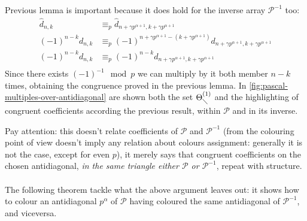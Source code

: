 Previous lemma is important because it does hold for the inverse array $\mathcal{P}^{-1}$ too:
\begin{displaymath}
    \begin{split}
        \hat{d}_{n,k} &\equiv_{p} \hat{d}_{n+\gamma p^{\alpha+1}, k+\gamma p^{\alpha+1}} \\
        (-1)^{n-k}d_{n,k} &\equiv_{p} (-1)^{n+\gamma p^{\alpha+1}-(k+\gamma p^{\alpha+1})}d_{n+\gamma p^{\alpha+1}, k+\gamma p^{\alpha+1}} \\
        (-1)^{n-k}d_{n,k} &\equiv_{p} (-1)^{n-k}d_{n+\gamma p^{\alpha+1}, k+\gamma p^{\alpha+1}} \\
    \end{split}
\end{displaymath}
Since there exists $(-1)^{-1}\mod p$ we can multiply by it both member $n-k$ times,
obtaining the congruence proved in the previous lemma.
In \autoref{fig:pascal-multiples-over-antidiagonal} are shown both the set
$\Theta_{\diagdown}^{(1)}$ and the highlighting of congruent coefficients
according the previous result, within $\mathcal{P}$ and in its inverse.

Pay attention: this doesn't relate coefficients
of $\mathcal{P}$ and $\mathcal{P}^{-1}$ (from the colouring point of view 
doesn't imply any relation about colours assignment: generally it is not the case,
except for even $p$), it merely says that 
congruent coefficients on the chosen antidiagonal, \emph{in the same triangle
either $\mathcal{P}$ or $\mathcal{P}^{-1}$}, repeat with structure.
\\\\
The following theorem tackle what the above argument leaves out: it 
shows how to colour an antidiagonal $p^{\alpha}$ of $\mathcal{P}$
having coloured the same antidiagonal of $\mathcal{P}^{-1}$, and viceversa.



